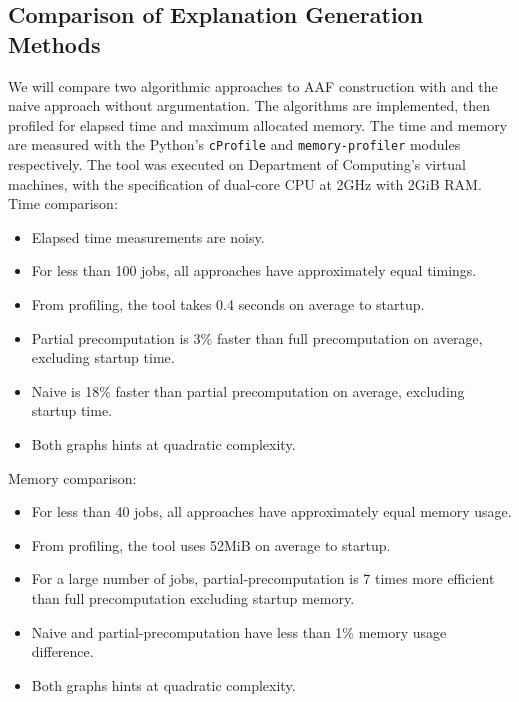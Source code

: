 \subsection{Comparison of Explanation Generation Methods}

We will compare two algorithmic approaches to AAF construction with and the naive approach without argumentation. The algorithms are implemented, then profiled for elapsed time and maximum allocated memory. The time and memory are measured with the Python's \texttt{cProfile} and \texttt{memory-profiler} modules respectively. The tool was executed on Department of Computing's virtual machines, with the specification of dual-core CPU at 2GHz with 2GiB RAM.
\linespace
Time comparison:
\begin{itemize}
	\item Elapsed time measurements are noisy.
	\item For less than 100 jobs, all approaches have approximately equal timings.
	\item From profiling, the tool takes 0.4 seconds on average to startup.
	\item Partial precomputation is 3\% faster than full precomputation on average, excluding startup time.
	\item Naive is 18\% faster than partial precomputation on average, excluding startup time.
	\item Both graphs hints at quadratic complexity.
\end{itemize}

Memory comparison:
\begin{itemize}
	\item For less than 40 jobs, all approaches have approximately equal memory usage.
	\item From profiling, the tool uses 52MiB on average to startup.
	\item For a large number of jobs, partial-precomputation is 7 times more efficient than full precomputation excluding startup memory.
	\item Naive and partial-precomputation have less than 1\% memory usage difference.
	\item Both graphs hints at quadratic complexity.
\end{itemize}

\newpage

